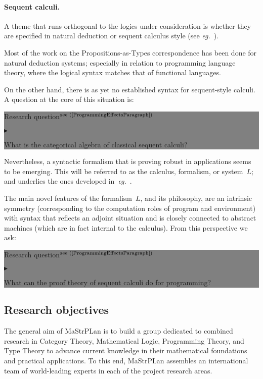 \documentclass[11pt,twocolumn]{article}
\newenvironment{btritemize}
  {\begin{list}{\btr}
  {\setlength{\topsep}{2pt}
   \setlength{\partopsep}{2pt}
   \setlength{\itemsep}{2.5pt}
   \setlength{\parsep}{2.5pt}
   \setlength{\leftmargin}{1em}
   \setlength{\labelwidth}{.5em}}}
  {\end{list}}
\newcommand{\mytextsf}[1]{\textsf{\small #1}}
\newcommand{\erc}{{\small\sf MaStrPLan}}
\newcommand{\eg}{\emph{eg.}}
\newcommand{\SysL}{$L$}%
\newcommand{\btr}{$\blacktriangleright$}
\newcommand{\reqpsize}{8.113395cm}%
\newcommand{\req}[2]{\begin{center}\colorbox{grey}{\begin{minipage}{\reqpsize} 
  \mytextsf{Research question}\hfill$^{\mbox{\scriptsize see #1 }}$\\[-5.5mm]
  \begin{btritemize}
  \item #2
  \end{btritemize}
\end{minipage}}\end{center}}
\begin{document}
\paragraph{Sequent calculi.}
\label{SequentCalculiParagraph}

A theme that runs orthogonal to the logics under consideration is whether
they are specified in natural deduction or sequent calculus
style (see \eg~\cite{vonPlato}).

Most of the work on the Propositions-as-Types correspondence has been done for
natural deduction systems; especially in relation to programming language
theory, where the logical syntax matches that of functional languages.  

On the other hand, there is as yet no established syntax for sequent-style
calculi.  A question at the core of this situation is:
%
\req{(\ref{ProgrammingEffectsParagraph})}
  {What is the categorical algebra of classical sequent calculi?}
%
Nevertheless, a syntactic formalism that is proving robust in applications
seems to be emerging.  This will be referred to as the calculus,
formalism, or system~\SysL; and underlies the ones developed
in~\eg~\cite{CurienHerbelin,Wadler,Munch,CurienMunch}.

The main novel features of the formalism~\SysL, and its philosophy, are an
intrinsic symmetry (corresponding to the computation roles of program and
environment) with syntax that reflects an adjoint situation and is closely
connected to abstract machines (which are in fact internal to the
calculus).  From this perspective we ask:
%
\req{(\ref{ProgrammingEffectsParagraph})}
  {What can the proof theory of sequent calculi do for programming?}

\subsection{Research objectives}
\label{ObjectivesSubsection}

The general aim of {\erc} is to build a group dedicated to combined
research in Category Theory, Mathematical Logic, Programming Theory, and
Type Theory to advance current knowledge in their mathematical foundations
and practical applications.  To this end, {\erc} assembles an
international team of world-leading experts in each of the project
research areas.  
\end{document}
